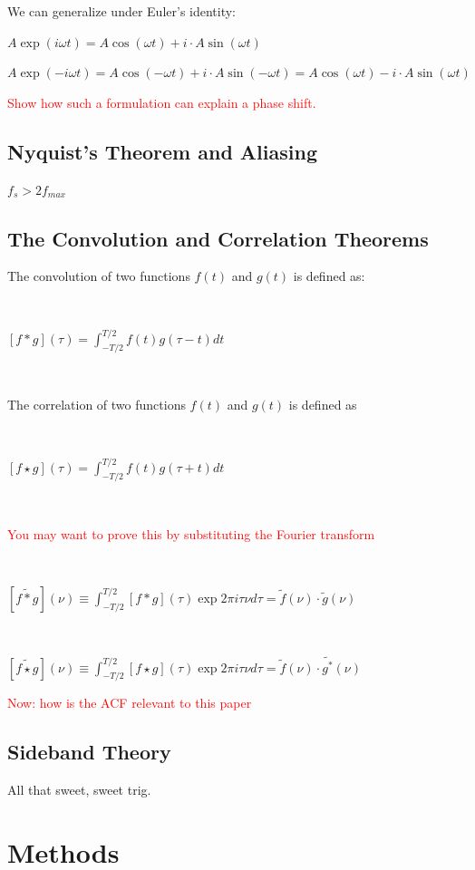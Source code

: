 \documentclass[a4paper]{article}
\begin{document}
We can generalize under Euler's identity:

$A\exp(i \omega t) = A \cos(\omega t) + i \cdot A \sin(\omega t)$

$A\exp(-i \omega t) = A \cos(-\omega t) + i \cdot A \sin(-\omega t) = A \cos(\omega t) - i \cdot A \sin(\omega t)$

\textcolor{red}{Show how such a formulation can explain a phase shift.}

\subsection{Nyquist's Theorem and Aliasing}

$f_s > 2 f_{max}$

\subsection{The Convolution and Correlation Theorems}

The convolution of two functions $f(t)$ and $g(t)$ is defined as:

\

$[f * g](\tau) = \int_{-T / 2}^{T / 2} f(t) g(\tau - t) dt$

\

The correlation of two functions $f(t)$ and $g(t)$ is defined as

\

$[f \star g](\tau) = \int_{-T / 2}^{T / 2} f(t) g(\tau + t) dt$

\

\textcolor{red}{You may want to prove this by substituting the Fourier transform}

\

$[\tilde{f * g}](\nu) \equiv \int_{-T / 2}^{T / 2}[f * g](\tau) \exp{2 \pi i \tau \nu} d \tau = \tilde{f}(\nu) \cdot \tilde{g}(\nu)$

\

$[\tilde{f \star g}](\nu) \equiv \int_{-T / 2}^{T / 2}[f \star g](\tau) \exp{2 \pi i \tau \nu} d \tau = \tilde{f}(\nu) \cdot \tilde{g^*}(\nu)$

\textcolor{red}{Now: how is the ACF relevant to this paper}

\subsection{Sideband Theory}

All that sweet, sweet trig.

\section{Methods}
\end{document}
